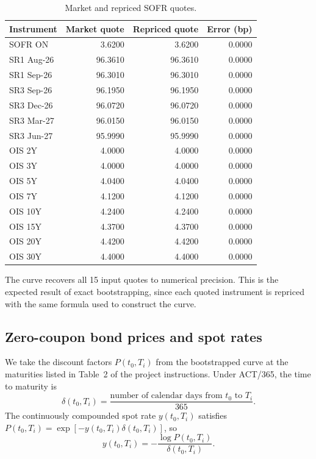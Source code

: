 \documentclass[11pt,a4paper]{article}
\begin{document}
\begin{table}[H]
  \centering
  \caption{Market and repriced SOFR quotes.}
  \label{tab:bootstrap-repricing}
  \begin{tabular}{lrrr}
    \toprule
    Instrument & Market quote & Repriced quote & Error (bp) \\
    \midrule
    SOFR ON    &  3.6200 &  3.6200 & 0.0000 \\
    SR1 Aug-26 & 96.3610 & 96.3610 & 0.0000 \\
    SR1 Sep-26 & 96.3010 & 96.3010 & 0.0000 \\
    SR3 Sep-26 & 96.1950 & 96.1950 & 0.0000 \\
    SR3 Dec-26 & 96.0720 & 96.0720 & 0.0000 \\
    SR3 Mar-27 & 96.0150 & 96.0150 & 0.0000 \\
    SR3 Jun-27 & 95.9990 & 95.9990 & 0.0000 \\
    OIS 2Y     &  4.0000 &  4.0000 & 0.0000 \\
    OIS 3Y     &  4.0000 &  4.0000 & 0.0000 \\
    OIS 5Y     &  4.0400 &  4.0400 & 0.0000 \\
    OIS 7Y     &  4.1200 &  4.1200 & 0.0000 \\
    OIS 10Y    &  4.2400 &  4.2400 & 0.0000 \\
    OIS 15Y    &  4.3700 &  4.3700 & 0.0000 \\
    OIS 20Y    &  4.4200 &  4.4200 & 0.0000 \\
    OIS 30Y    &  4.4000 &  4.4000 & 0.0000 \\
    \bottomrule
  \end{tabular}
\end{table}

The curve recovers all 15 input quotes to numerical precision.
This is the expected result of exact bootstrapping, since each
quoted instrument is repriced with the same formula used to
construct the curve.

\subsection{Zero-coupon bond prices and spot rates}\label{subsec:1c}

We take the discount factors \(P(t_0,T_i)\) from the bootstrapped
curve at the maturities listed in Table~2 of the project instructions.
Under ACT/365, the time to maturity is
\[
\delta(t_0,T_i)
  = \frac{\text{number of calendar days from }t_0\text{ to }T_i}{365}.
\]
The continuously compounded spot rate \(y(t_0,T_i)\) satisfies
\(P(t_0,T_i)=\exp[-y(t_0,T_i)\delta(t_0,T_i)]\), so
\[
y(t_0,T_i)=-\frac{\log P(t_0,T_i)}{\delta(t_0,T_i)}.
\]
\end{document}
